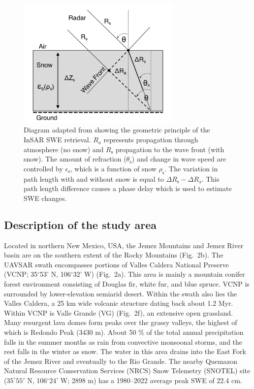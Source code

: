 \begin{figure}[t]
\centering\includegraphics[width=8cm]{figures/ch3_figs/fig01.pdf}
\caption{Diagram adapted from \citet{leinssSnowWaterEquivalent2015} showing the geometric principle of the InSAR SWE retrieval. $R_a$ represents propagation through atmosphere (no snow) and $R_\mathrm{s}$ propagation to the wave front (with snow). The amount of refraction ($\theta_\mathrm{s}$) and change in wave speed are controlled by $\epsilon_\mathrm{s}$, which is a function of snow $\rho_\mathrm{s}$. The variation in path length with and without snow is equal to $\Delta R_\mathrm{s} - \Delta R_\mathrm{a}$. This path length difference causes a phase delay which is used to estimate SWE changes.}
\end{figure}

\hypertarget{ch3-methods-3}{\subsection{Description of the study area}\label{ch3-methods-3}}


Located in northern New Mexico, USA, the Jemez Mountains and Jemez River basin are on the southern extent of the Rocky Mountains (Fig.~2b). The UAVSAR swath encompasses portions of Valles Caldera National Preserve (VCNP; 35$^{\circ}$53' N, 106$^{\circ}$32' W) (Fig.~2a). This area is mainly a mountain conifer forest environment consisting of Douglas fir, white fur, and blue spruce. VCNP is surrounded by lower-elevation semiarid desert. Within the swath also lies the Valles Caldera, a 25 km wide volcanic structure dating back about 1.2 Myr. Within VCNP is Valle Grande (VG) (Fig.~2f), an extensive open grassland. Many resurgent lava domes form peaks over the grassy valleys, the highest of which is Redondo Peak (3430 m). About 50 \% of the total annual precipitation falls in the summer months as rain from convective monsoonal storms, and the rest falls in the winter as snow. The water in this area drains into the East Fork of the Jemez River and eventually to the Rio Grande. The nearby Quemazon Natural Resource Conservation Services (NRCS) Snow Telemetry (SNOTEL) site ($35^{\circ}55'$ N, 106$^{\circ}$24' W; 2898 m) has a 1980--2022 average peak SWE of 22.4 cm.

